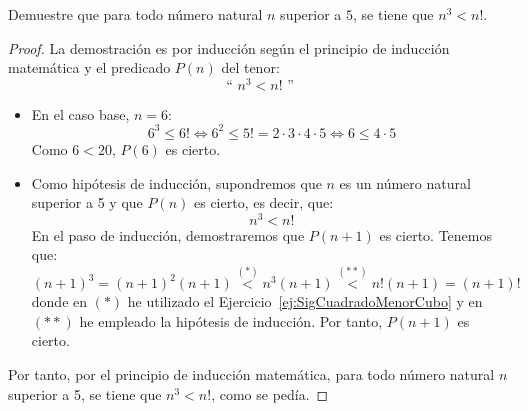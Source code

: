 \begin{ejercicio}
    Demuestre que para todo número natural $n$ superior a $5$, se tiene que $n^3<n!$.

    \begin{proof}
        La demostración es por inducción según el principio de inducción matemática y el predicado $P(n)$ del tenor:
    \begin{equation*}
        \text{`` }n^3<n!\text{ ''}
    \end{equation*}

    \begin{itemize}
        \item En el caso base, $n=6$:
            \begin{equation*}
                6^3 \leq 6! \Longleftrightarrow 6^2\leq 5!=2\cdot 3\cdot 4\cdot 5 \Longleftrightarrow 6 \leq 4\cdot 5
            \end{equation*}
            Como $6 < 20$, $P(6)$ es cierto.

        \item Como hipótesis de inducción, supondremos que $n$ es un número natural superior a 5 y que $P(n)$ es cierto, es decir, que:
            \begin{equation*}
                n^3<n!
            \end{equation*}
            En el paso de inducción, demostraremos que $P(n+1)$ es cierto. Tenemos que:
            \begin{equation*}
                (n+1)^3 = (n+1)^2(n+1) \stackrel{(\ast)}{<{}} n^3(n+1) \stackrel{(\ast\ast)}{<{}} n!(n+1) = (n+1)!
            \end{equation*}
            donde en $(\ast)$ he utilizado el Ejercicio~\ref{ej:SigCuadradoMenorCubo} y en $(\ast\ast)$ he empleado la hipótesis de inducción.
            Por tanto, $P(n+1)$ es cierto.
    \end{itemize}
    Por tanto, por el principio de inducción matemática, para todo número natural $n$ superior a 5, se tiene que $n^3<n!$, como se pedía.
    \end{proof}
\end{ejercicio}

